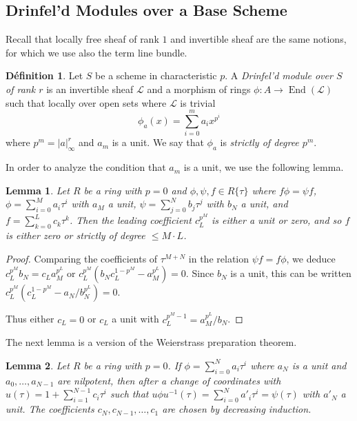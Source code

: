 \documentclass[12pt,a4paper]{article}
\theoremstyle{plain}
\newtheorem{lemma}{Lemma}[section]
\theoremstyle{definition}
\newtheorem{definition}{D\'efinition}[section]
\theoremstyle{remark}
\DeclareMathOperator{\End}{End}
\newcommand{\cL}{\mathcal{L}}
\providecommand{\cL}{\mathcal{L}}
\providecommand{\End}{\operatorname{End}}
\begin{document}
\subsection{Drinfel'd Modules over a Base Scheme}
\label{sec:base}

Recall that locally free sheaf of rank $1$ and invertible sheaf are the same notions, for which we use also the term line bundle.

\begin{definition}
\label{def:scheme}
Let $S$ be a scheme in characteristic $p$. A \emph{Drinfel'd module over $S$ of rank $r$} is an invertible sheaf $\cL$ and a morphism of rings $\phi: A \to \End(\cL)$ such that locally over open sets where $\cL$ is trivial
\[
\phi_a(x) = \sum_{i=0}^{m} a_i x^{p^i}
\]
where $p^m = |a|_\infty^r$ and $a_m$ is a unit. We say that $\phi_a$ is \emph{strictly of degree $p^m$}.
\end{definition}

In order to analyze the condition that $a_m$ is a unit, we use the following lemma.

\begin{lemma}
\label{lem:unit}
Let $R$ be a ring with $p = 0$ and $\phi, \psi, f \in R\{\tau\}$ where $f\phi = \psi f$, $\phi = \sum_{i=0}^{M} a_i \tau^i$ with $a_M$ a unit, $\psi = \sum_{j=0}^{N} b_j \tau^j$ with $b_N$ a unit, and $f = \sum_{k=0}^{L} c_k \tau^k$. Then the leading coefficient $c_L^{p^M}$ is either a unit or zero, and so $f$ is either zero or strictly of degree $\leq M \cdot L$.
\end{lemma}

\begin{proof}
Comparing the coefficients of $\tau^{M+N}$ in the relation $\psi f = f \phi$, we deduce $c_L^{p^M} b_N = c_L a_M^{p^L}$ or $c_L^{p^M}(b_N c_L^{1-p^M} - a_M^{p^L}) = 0$. Since $b_N$ is a unit, this can be written $c_L^{p^M}(c_L^{1-p^M} - a_N/b_N^{p^L}) = 0$.

Thus either $c_L = 0$ or $c_L$ a unit with $c_L^{p^M-1} = a_M^{p^L}/b_N$.
\end{proof}

The next lemma is a version of the Weierstrass preparation theorem.

\begin{lemma}
\label{lem:weierstrass}
Let $R$ be a ring with $p = 0$. If $\phi = \sum_{i=0}^{N} a_i \tau^i$ where $a_N$ is a unit and $a_0, \ldots, a_{N-1}$ are nilpotent, then after a change of coordinates with $u(\tau) = 1 + \sum_{i=1}^{N-1} c_i \tau^i$ such that $u \phi u^{-1}(\tau) = \sum_{i=0}^{N} a'_i \tau^i = \psi(\tau)$ with $a'_N$ a unit. The coefficients $c_N, c_{N-1}, \ldots, c_1$ are chosen by decreasing induction.
\end{lemma}
\end{document}
